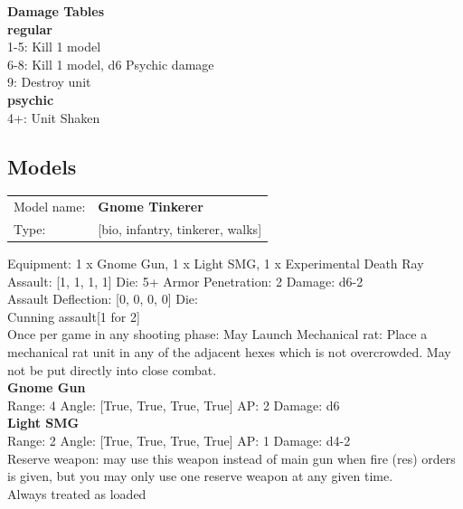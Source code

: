 {\bf Damage Tables} \\
 {\bf regular } \\
1-5: Kill 1 model \\
6-8: Kill 1 model, d6 Psychic damage \\
9: Destroy unit \\
 {\bf psychic } \\
4+: Unit Shaken \\


\clearpage

\subsection{ Models }

\begin{tabular}{ll}
Model name: & {\bf Gnome Tinkerer } \\
Type: & [bio, infantry, tinkerer, walks] \\
\end{tabular}

Equipment: 1 x Gnome Gun, 1 x Light SMG, 1 x Experimental Death Ray \\

Assault: [1, 1, 1, 1] Die: 5+ Armor Penetration: 2 Damage: d6-2 \\
Assault Deflection: [0, 0, 0, 0] Die: \\
\indent Cunning assault[1 for 2]\\ 
 

Once per game in any shooting phase: May Launch Mechanical rat: Place a mechanical rat unit in any of the adjacent hexes which is not overcrowded. May not be put directly into close combat. \\ 


{\bf Gnome Gun } \\



Range: 4  Angle: [True, True, True, True] AP: 2 Damage: d6 \\




{\bf Light SMG } \\



Range: 2  Angle: [True, True, True, True] AP: 1 Damage: d4-2 \\
Reserve weapon: may use this weapon instead of main gun when fire (res) orders is given, but you may only use one reserve weapon at any given time.\\ 
Always treated as loaded\\ 




